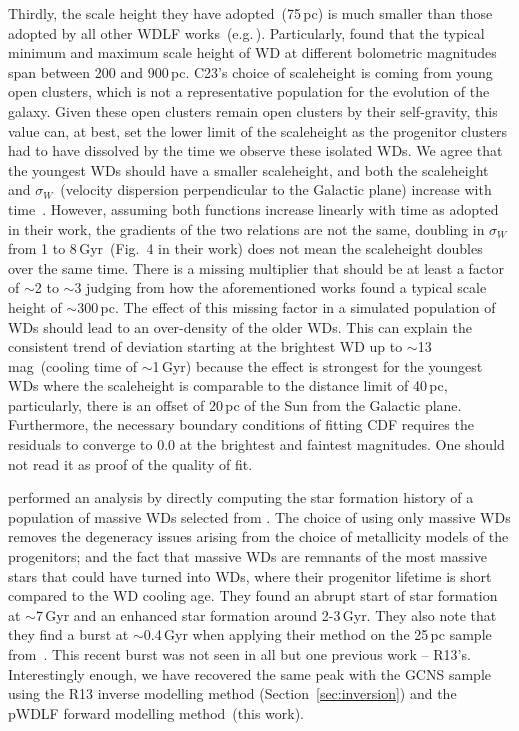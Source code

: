 \documentclass[fleqn,usenatbib]{mnras}
\begin{document}
Thirdly, the scale height they have adopted~(75\,pc) is much smaller than those
adopted by all other WDLF works~(e.g.\,\citealt{2006AJ....131..571H,
2011MNRAS.417...93R, 2019MNRAS.482..715L}). Particularly,
\citet{2006AJ....131..571H} found that the typical minimum and maximum scale
height of WD at different bolometric magnitudes span between 200 and 900\,pc.
C23's choice of scaleheight is coming from young open clusters, which is not
a representative population for the evolution of the galaxy. Given these open
clusters remain open clusters by their self-gravity, this value can, at best,
set the lower limit of the scaleheight as the progenitor clusters had to have
dissolved by the time we observe these isolated WDs. We agree that the youngest
WDs should have a smaller scaleheight, and both the scaleheight and
$\sigma_W$~(velocity dispersion perpendicular to the Galactic plane) increase
with time~\citep{2019MNRAS.484.3544R}. However, assuming both functions
increase linearly with time as adopted in their work, the gradients of the two
relations are not the same, doubling in $\sigma_W$ from 1 to 8\,Gyr~(Fig.~4 in
their work) does not mean the scaleheight doubles over the same time. There is
a missing multiplier that should be at least a factor of $\sim$2 to $\sim$3
judging from how the aforementioned works found a typical scale height of
$\sim$300\,pc. The effect of this missing factor in a simulated population of
WDs should lead to an over-density of the older WDs. This can explain the
consistent trend of deviation starting at the brightest WD up to
$\sim$13\,mag~(cooling time of $\sim$1\,Gyr) because the effect is strongest
for the youngest WDs where the scaleheight is comparable to the distance limit
of 40\,pc, particularly, there is an offset of 20\,pc of the Sun from the
Galactic plane. Furthermore, the necessary boundary conditions of fitting
CDF requires the residuals to converge to 0.0 at the brightest and faintest
magnitudes. One should not read it as proof of the quality of fit.

\citet{2019ApJ...878L..11I} performed an analysis by directly
computing the star formation history of a population of massive WDs selected
from \citet{2019Natur.565..202T}. The choice of using only massive WDs
removes the degeneracy issues arising from the choice of metallicity models
of the progenitors; and the fact that massive WDs are remnants of the most
massive stars that could have turned into WDs, where their progenitor lifetime
is short compared to the WD cooling age. They found an abrupt start of star
formation at $\sim$7\,Gyr and an enhanced star formation around 2-3\,Gyr. They
also note that they find a burst at $\sim$0.4\,Gyr when applying their method
on the 25\,pc sample from~\citet{2017ASPC..509...59O}. This recent burst was not
seen in all but one previous work -- R13's. Interestingly enough, we have
recovered the same peak with the GCNS sample using the R13 inverse
modelling method (Section~\ref{sec:inversion}) and the pWDLF forward modelling
method~(this work). 
\end{document}
